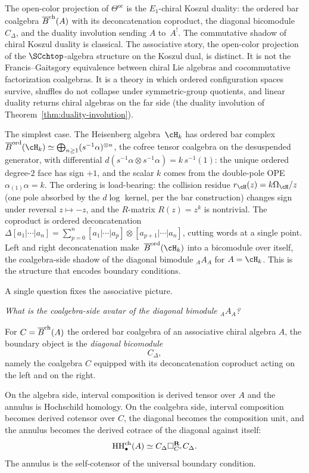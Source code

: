 The open-color projection of $\Theta^{\mathrm{oc}}$ is the
$E_1$-chiral Koszul duality: the ordered bar coalgebra $\overline{B}^{\mathrm{ch}}(A)$
with its deconcatenation coproduct, the diagonal bicomodule
$C_\Delta$, and the duality involution sending $A$ to~$A^!$. The
commutative shadow of chiral Koszul duality is classical. The
associative story, the open-color projection of the
$\SCchtop$-algebra structure on the Koszul dual, is distinct. It is
not the Francis--Gaitsgory equivalence between chiral Lie algebras
and cocommutative factorization coalgebras. It is a theory in which
ordered configuration spaces survive, shuffles do not collapse under
symmetric-group quotients, and linear duality returns chiral
algebras on the far side (the duality involution of
Theorem~\ref{thm:duality-involution}).

The simplest case. The Heisenberg algebra~$\cH_k$
has ordered bar complex
$\Barchord(\cH_k)\simeq\bigoplus_{n\ge 1}
(s^{-1}\alpha)^{\otimes n}$, the cofree tensor coalgebra on the
desuspended generator, with differential
$d(s^{-1}\alpha\otimes s^{-1}\alpha)=k\,s^{-1}(1)$:
the unique ordered degree-$2$ face has sign \(+1\), and the scalar
\(k\) comes from the double-pole OPE
$\alpha_{(1)}\alpha=k$. The ordering is load-bearing:
the collision residue $r_{\cH}(z)=k\Omega_{\cH}/z$ (one pole absorbed
by the $d\log$ kernel, per the bar construction) changes sign under
reversal $z\mapsto -z$, and the $R$-matrix $R(z)=z^k$ is
nontrivial. The coproduct is ordered deconcatenation
$\Delta[a_1|\cdots|a_n]=\sum_{p=0}^{n}
[a_1|\cdots|a_p]\otimes[a_{p+1}|\cdots|a_n]$,
cutting words at a single point. Left and right
deconcatenation make~$\Barchord(\cH_k)$
into a bicomodule over itself, the coalgebra-side shadow of
the diagonal bimodule ${}_A A_A$ for $A=\cH_k$. This is
the structure that encodes boundary conditions.

A single question fixes the associative picture.

\medskip

\emph{What is the coalgebra-side avatar of the diagonal bimodule ${}_A A_A$?}

\medskip

For $C=\overline{B}^{\mathrm{ch}}(A)$ the ordered bar coalgebra of an associative chiral
algebra $A$, the boundary object is the \emph{diagonal bicomodule}
\[
C_\Delta,
\]
namely the coalgebra $C$ equipped with its deconcatenation coproduct acting on the left and on the right.

On the algebra side, interval composition is derived tensor over $A$ and the annulus is Hochschild
homology. On the coalgebra side, interval composition becomes derived cotensor over $C$, the
diagonal becomes the composition unit, and the annulus becomes the derived cotrace of the diagonal
against itself:
\[
\operatorname{HH}^{\mathrm{ch}}_\bullet(A)\simeq C_\Delta \square_{C^e}^{\mathbf R} C_\Delta.
\]
The annulus is the self-cotensor of the universal boundary condition.

